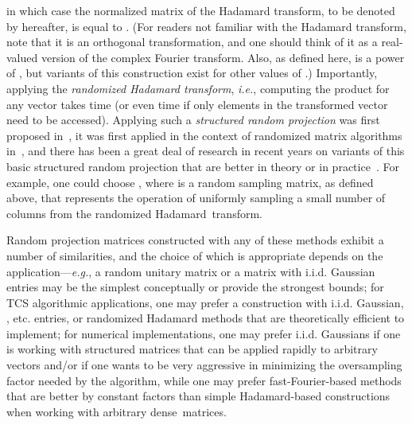 \documentclass[twoside]{article}
\begin{document}
in which case the  normalized matrix of the Hadamard transform,
to be denoted by  hereafter, is equal to .
(For readers not familiar with the Hadamard transform, note that it 
is an orthogonal transformation, and one should think of it as a 
real-valued version of the complex Fourier transform.  Also, as defined 
here,  is a power of , but variants of this construction exist for 
other values of .)
Importantly, applying the \emph{randomized Hadamard transform}, \emph{i.e.},
computing the product  for any vector  takes 
 time (or even  time if only  elements in the 
transformed vector need to be accessed).
Applying such a \emph{structured random projection} was first proposed 
in~\cite{AC06,AC06-JRNL09}, it was first applied in the context of 
randomized matrix algorithms in~\cite{Sarlos06,DMMS07_FastL2_NM10}, and 
there has been a great deal of research in recent years on variants of this 
basic structured random projection that are better in theory or in 
practice~\cite{Matousek08_RSA,DMMS07_FastL2_NM10,LWFMRT07,RT08,AL08,LAS08,AMT10,AC10,DKT10,KN10_TR,KN10b_TR,AL11}.
For example, one could choose , where  is a random sampling
matrix, as defined above, that represents the operation of uniformly 
sampling a small number of columns from the randomized Hadamard~transform.

Random projection matrices constructed with any of these methods exhibit a 
number of similarities, and the choice of which is appropriate depends on 
the application---\emph{e.g.}, a random unitary matrix or a matrix with 
i.i.d.  Gaussian entries may be the simplest conceptually or provide the 
strongest bounds; for TCS algorithmic applications, one may prefer a 
construction with i.i.d. Gaussian, , etc. entries, or randomized 
Hadamard methods that are theoretically efficient to implement; for 
numerical implementations, one may prefer i.i.d. Gaussians if one is working 
with structured matrices that can be applied rapidly to arbitrary vectors 
and/or if one wants to be very aggressive in minimizing the oversampling 
factor needed by the algorithm, while one may prefer fast-Fourier-based 
methods that are better by constant factors than simple Hadamard-based 
constructions when working with arbitrary dense~matrices.
\end{document}
